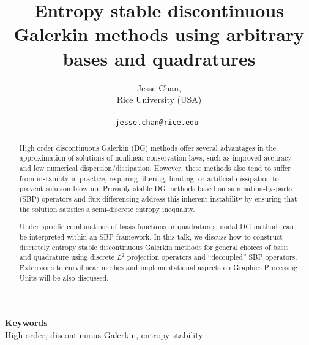 \documentclass[a4paper]{article} %
\date{} %
\def\keywords#1{\begin{center}{\bf Keywords}\\{#1}\end{center}} %
\begin{document}
\title{Entropy stable discontinuous Galerkin methods using arbitrary bases and quadratures}

\author{Jesse Chan, \\ %
       Rice University (USA) \\ \\ %
       \tt{jesse.chan@rice.edu} %
       }%


\maketitle

\thispagestyle{empty}


\begin{abstract}
High order discontinuous Galerkin (DG) methods offer several advantages in the approximation of solutions of nonlinear conservation laws, such as improved accuracy and low numerical dispersion/dissipation.  However, these methods also tend to suffer from instability in practice, requiring filtering, limiting, or artificial dissipation to prevent solution blow up.  Provably stable DG methods based on summation-by-parts (SBP) operators and flux differencing address this inherent instability by ensuring that the solution satisfies a semi-discrete entropy inequality.  

Under specific combinations of basis functions or quadratures, nodal DG methods can be interpreted within an SBP framework.  In this talk, we discuss how to construct discretely entropy stable discontinuous Galerkin methods for general choices of basis and quadrature using discrete $L^2$ projection operators and ``decoupled'' SBP operators.  Extensions to curvilinear meshes and implementational aspects on Graphics Processing Units will be also discussed.  
\end{abstract}

\keywords{High order, discontinuous Galerkin, entropy stability} %






\end{document}
